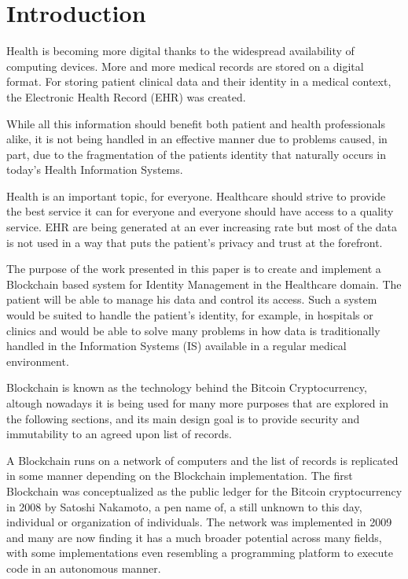 \chapter{Introduction}

Health is becoming more digital thanks to the widespread availability of
computing devices.  More and more medical records are stored on a digital
format.  For storing patient clinical data and their identity in a medical
context, the Electronic Health Record (EHR) was created.
 
While all this information should benefit both patient and health professionals
alike, it is not being handled in an effective manner due to problems caused,
in part, due to the fragmentation of the patients identity that naturally
occurs in today's Health Information Systems.

Health is an important topic, for everyone. Healthcare should strive to provide
the best service it can for everyone and everyone should have access to a
quality service. EHR are being generated at an ever increasing rate but most of
the data is not used in a way that puts the patient's privacy and trust at the
forefront.

The purpose of the work presented in this paper is to create and implement a
Blockchain based system for Identity Management in the Healthcare domain. The
patient will be able to manage his data and control its access. Such a system
would be suited to handle the patient’s identity, for example, in hospitals or
clinics and would be able to solve many problems in how data is traditionally
handled in the Information Systems (IS) available in a regular medical
environment.

Blockchain is known as the technology behind the Bitcoin Cryptocurrency,
altough nowadays it is being used for many more purposes that are explored in
the following sections, and its main design goal is to provide security and
immutability to an agreed upon list of records.

A Blockchain runs on a network of computers and the list of records is
replicated in some manner depending on the Blockchain implementation. The first
Blockchain was conceptualized as the public ledger for the Bitcoin
cryptocurrency in 2008 by Satoshi Nakamoto, a pen name of, a still unknown to
this day, individual or organization of individuals.  The network was
implemented in 2009 and many are now finding it has a much broader potential
across many fields, with some implementations even resembling a programming
platform to execute code in an autonomous manner.  \cite{Nakamoto2008}

